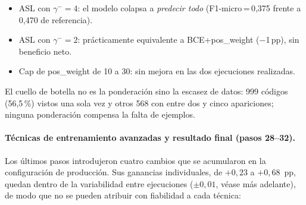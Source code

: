\begin{itemize}
 \item ASL con $\gamma^-=4$: el modelo colapsa a \emph{predecir todo} (F1-micro\,=\,0,375 frente a 0,470 de referencia).
 \item ASL con $\gamma^-=2$: prácticamente equivalente a BCE+pos\_weight ($-$1\,pp), sin beneficio neto.
 \item Cap de pos\_weight de 10 a 30: sin mejora en las dos ejecuciones realizadas.
\end{itemize}

El cuello de botella no es la ponderación sino la escasez de datos: 999 códigos (56,5\,\%) vistos una sola vez y otros 568 con entre dos y cinco apariciones; ninguna ponderación compensa la falta de ejemplos.

\paragraph{Técnicas de entrenamiento avanzadas y resultado final (pasos 28--32).}
Los últimos pasos introdujeron cuatro cambios que se acumularon en la configuración de producción. Sus ganancias individuales, de $+0{,}23$ a $+0{,}68$~pp, quedan dentro de la variabilidad entre ejecuciones ($\pm 0{,}01$, véase más adelante), de modo que no se pueden atribuir con fiabilidad a cada técnica:

